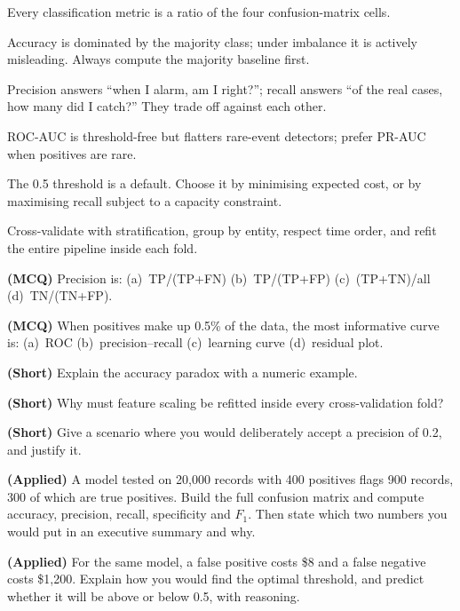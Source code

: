\begin{chaptersummary}
\begin{tight}
  \item Every classification metric is a ratio of the four confusion-matrix cells.
  \item Accuracy is dominated by the majority class; under imbalance it is
        actively misleading. Always compute the majority baseline first.
  \item Precision answers ``when I alarm, am I right?''; recall answers ``of the
        real cases, how many did I catch?'' They trade off against each other.
  \item ROC-AUC is threshold-free but flatters rare-event detectors; prefer PR-AUC
        when positives are rare.
  \item The 0.5 threshold is a default. Choose it by minimising expected cost, or
        by maximising recall subject to a capacity constraint.
  \item Cross-validate with stratification, group by entity, respect time order,
        and refit the entire pipeline inside each fold.
\end{tight}
\end{chaptersummary}

\begin{reviewq}
  \item \textbf{(MCQ)} Precision is: (a)~TP/(TP+FN) (b)~TP/(TP+FP)
        (c)~(TP+TN)/all (d)~TN/(TN+FP).
  \item \textbf{(MCQ)} When positives make up 0.5\% of the data, the most
        informative curve is: (a)~ROC (b)~precision--recall (c)~learning curve
        (d)~residual plot.
  \item \textbf{(Short)} Explain the accuracy paradox with a numeric example.
  \item \textbf{(Short)} Why must feature scaling be refitted inside every
        cross-validation fold?
  \item \textbf{(Short)} Give a scenario where you would deliberately accept a
        precision of 0.2, and justify it.
  \item \textbf{(Applied)} A model tested on 20{,}000 records with 400 positives
        flags 900 records, 300 of which are true positives. Build the full confusion
        matrix and compute accuracy, precision, recall, specificity and $F_1$.
        Then state which two numbers you would put in an executive summary and why.
  \item \textbf{(Applied)} For the same model, a false positive costs \$8 and a
        false negative costs \$1{,}200. Explain how you would find the optimal
        threshold, and predict whether it will be above or below 0.5, with reasoning.
\end{reviewq}
